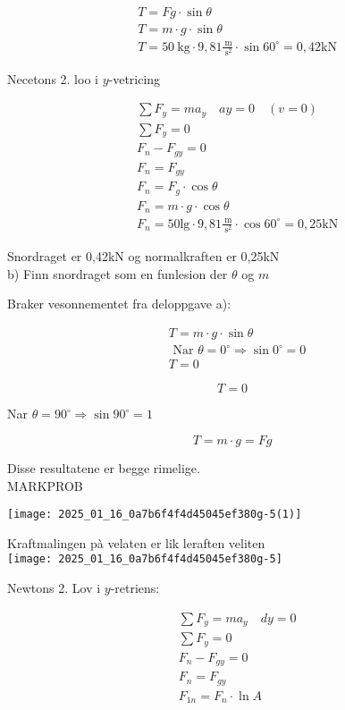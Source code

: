 \documentclass[10pt]{article}
\begin{document}
$$
\begin{aligned}
& T=F g \cdot \sin \theta \\
& T=m \cdot g \cdot \sin \theta \\
& T=50 \mathrm{~kg} \cdot 9,81 \frac{\mathrm{~m}}{\mathrm{~s}^{2}} \cdot \sin 60^{\circ}=0,42 \mathrm{kN}
\end{aligned}
$$

Necetons 2. loo i $y$-vetricing

$$
\begin{aligned}
& \sum F_{y}=m a_{y} \quad a y=0 \quad(v=0) \\
& \sum F_{y}=0 \\
& F_{n}-F_{g y}=0 \\
& F_{n}=F_{g y} \\
& F_{n}=F_{g} \cdot \cos \theta \\
& F_{n}=m \cdot g \cdot \cos \theta \\
& F_{n}=50 \mathrm{lg} \cdot 9,81 \frac{\mathrm{~m}}{\mathrm{~s}^{2}} \cdot \cos 60^{\circ}=0,25 \mathrm{kN}
\end{aligned}
$$

Snordraget er 0,42kN og normalkraften er 0,25kN\\
b) Finn snordraget som en funlesion der $\theta$ og $m$

Braker vesonnementet fra deloppgave a):

$$
\begin{aligned}
& T=m \cdot g \cdot \sin \theta \\
& \text { Nar } \theta=0^{\circ} \Rightarrow \sin 0^{\circ}=0 \\
& T=0
\end{aligned}
$$

$$
T=0
$$

Nar $\theta=90^{\circ} \Rightarrow \sin 90^{\circ}=1$

$$
T=m \cdot g=F g
$$

Disse resultatene er begge rimelige.\\

MARKPROB

\texttt{[image: 2025\_01\_16\_0a7b6f4f4d45045ef380g-5(1)]}

Kraftmalingen pà velaten er lik leraften veliten\\
\texttt{[image: 2025\_01\_16\_0a7b6f4f4d45045ef380g-5]}

Newtons 2. Lov i $y$-retriens:

$$
\begin{aligned}
& \sum F_{y}=m a_{y} \quad d y=0 \\
& \sum F_{y}=0 \\
& F_{n}-F_{g y}=0 \\
& F_{n}=F_{g y} \\
& F_{1 n}=F_{n} \cdot \ln A
\end{aligned}
$$
\end{document}
